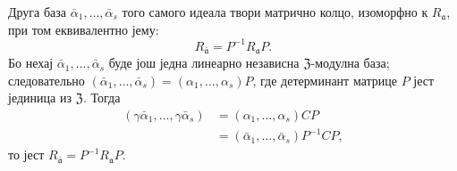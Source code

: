 \documentclass[11pt]{article}
\begin{document}
\setcounter{footnote}{24}

Друга база $\bar\alpha_1,\ldots,\bar\alpha_s$ того самого идеала твори матрично колцо, изоморфно к $R_{\mathfrak a}$, при том еквивалентно јему:
\[
        R_{\bar{\mathfrak a}}=P^{-1}R_{\mathfrak a}P.
\]
Бо нехај $\bar\alpha_1,\ldots,\bar\alpha_s$ буде још једна линеарно независна $\mathfrak Z$-модулна база; следовательно $(\bar\alpha_1,\ldots,\bar\alpha_s)=(\alpha_1,\ldots,\alpha_s)P$, где детерминант матрице $P$ јест јединица из $\mathfrak Z$. Тогда
\[
\begin{aligned}
(\gamma\bar\alpha_1,\ldots,\gamma\bar\alpha_s)
&=(\alpha_1,\ldots,\alpha_s)CP\\
&=(\bar\alpha_1,\ldots,\bar\alpha_s)P^{-1}CP,
\end{aligned}
\]
то јест $R_{\bar{\mathfrak a}}=P^{-1}R_{\mathfrak a}P$.
\end{document}
